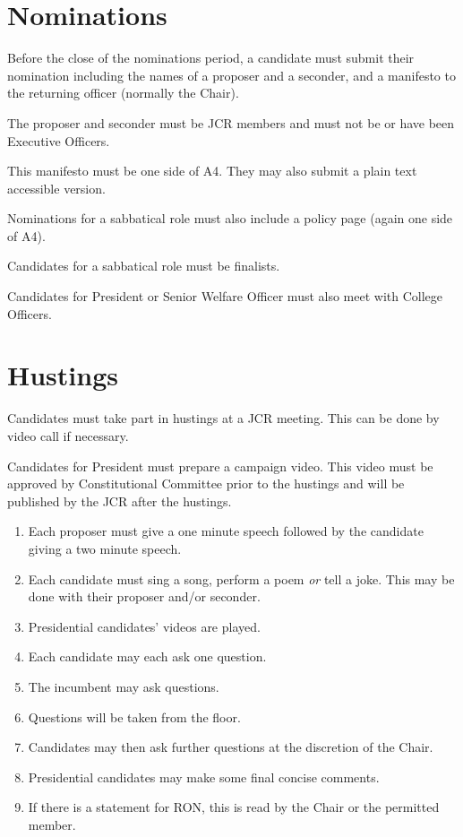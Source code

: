 \documentclass[12pt]{article}
\begin{document}
    \section{Nominations}
    Before the close of the nominations period, a candidate must submit their nomination including the names of a proposer and a seconder, and a manifesto to the returning officer (normally the Chair).

    The proposer and seconder must be JCR members and must not be or have been Executive Officers.

    This manifesto must be one side of A4. They may also submit a plain text accessible version.

    Nominations for a sabbatical role must also include a policy page (again one side of A4).

    Candidates for a sabbatical role must be finalists.

    Candidates for President or Senior Welfare Officer must also meet with College Officers.

    \section{Hustings}
    Candidates must take part in hustings at a JCR meeting. This can be done by video call if necessary.

    Candidates for President must prepare a campaign video. This video must be approved by Constitutional Committee prior to the hustings and will be published by the JCR after the hustings.

    \begin{enumerate}
        \item Each proposer must give a one minute speech followed by the candidate giving a two minute speech.
        \item Each candidate must sing a song, perform a poem \emph{or} tell a joke. This may be done with their proposer and/or seconder.
        \item Presidential candidates' videos are played.
        \item Each candidate may each ask one question.
        \item The incumbent may ask questions.
        \item Questions will be taken from the floor.
        \item Candidates may then ask further questions at the discretion of the Chair.
        \item Presidential candidates may make some final concise comments.
        \item If there is a statement for RON, this is read by the Chair or the permitted member.
    \end{enumerate}
\end{document}
